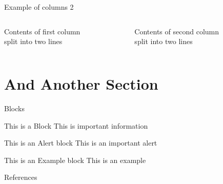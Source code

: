 \documentclass{beamer}
\begin{document}
\begin{frame}{Example of columns 2}
 \begin{columns}[T]
  \begin{column}[T]{5cm}
   Contents of first column \\ split into two lines
  \end{column}
  \begin{column}[T]{5cm}
   Contents of second column \\ split into two lines
  \end{column}
 \end{columns}
\end{frame}

\section{And Another Section}

\begin{frame}{Blocks}
 \begin{block}{This is a Block}
   This is important information
 \end{block}

 \begin{alertblock}{This is an Alert block}
   This is an important alert
 \end{alertblock}
  
 \begin{exampleblock}{This is an Example block}
  This is an example 
 \end{exampleblock}
\end{frame}

\begin{frame}{References}




\end{frame}
\end{document}
